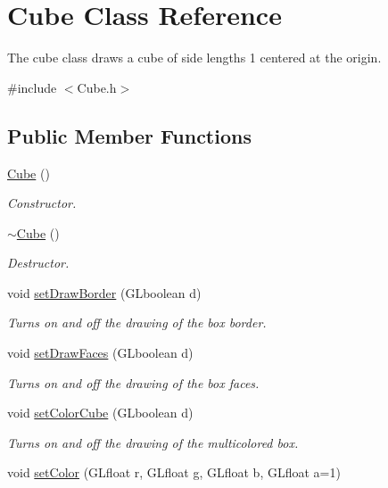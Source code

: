 \hypertarget{class_cube}{}\section{Cube Class Reference}
\label{class_cube}


The cube class draws a cube of side lengths 1 centered at the origin.  




{\ttfamily \#include $<$Cube.\+h$>$}

\subsection*{Public Member Functions}
\begin{DoxyCompactItemize}
\item 
\hyperlink{class_cube_a06f3d86fb63e3aad08623610aa3c17b4}{Cube} ()
\begin{DoxyCompactList}\small\item\em Constructor. \end{DoxyCompactList}\item 
\hyperlink{class_cube_aa814e979cecb8c451fdb332ded2cea1e}{$\sim$\+Cube} ()
\begin{DoxyCompactList}\small\item\em Destructor. \end{DoxyCompactList}\item 
void \hyperlink{class_cube_aa08ee7691f94b33978f17358577c82a4}{set\+Draw\+Border} (G\+Lboolean d)
\begin{DoxyCompactList}\small\item\em Turns on and off the drawing of the box border. \end{DoxyCompactList}\item 
void \hyperlink{class_cube_a80707754f50abfb13f6a106f117a59e9}{set\+Draw\+Faces} (G\+Lboolean d)
\begin{DoxyCompactList}\small\item\em Turns on and off the drawing of the box faces. \end{DoxyCompactList}\item 
void \hyperlink{class_cube_a215c64365cf3aeed78a9d3802ad1899e}{set\+Color\+Cube} (G\+Lboolean d)
\begin{DoxyCompactList}\small\item\em Turns on and off the drawing of the multicolored box. \end{DoxyCompactList}\item 
void \hyperlink{class_cube_a11b2c41497e69c2998766f3b34afcbfa}{set\+Color} (G\+Lfloat r, G\+Lfloat g, G\+Lfloat b, G\+Lfloat a=1)

\end{DoxyCompactItemize}
